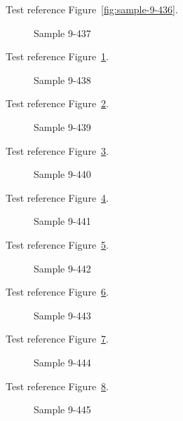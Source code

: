Test reference Figure~\ref{fig:sample-9-436}.

\begin{figure}[tbhp]
\caption{Sample 9-437}
\label{fig:sample-9-437}
\end{figure}

Test reference Figure~\ref{fig:sample-9-437}.

\begin{figure}[tbhp]
\caption{Sample 9-438}
\label{fig:sample-9-438}
\end{figure}

Test reference Figure~\ref{fig:sample-9-438}.

\begin{figure}[tbhp]
\caption{Sample 9-439}
\label{fig:sample-9-439}
\end{figure}

Test reference Figure~\ref{fig:sample-9-439}.

\begin{figure}[tbhp]
\caption{Sample 9-440}
\label{fig:sample-9-440}
\end{figure}

Test reference Figure~\ref{fig:sample-9-440}.

\begin{figure}[tbhp]
\caption{Sample 9-441}
\label{fig:sample-9-441}
\end{figure}

Test reference Figure~\ref{fig:sample-9-441}.

\begin{figure}[tbhp]
\caption{Sample 9-442}
\label{fig:sample-9-442}
\end{figure}

Test reference Figure~\ref{fig:sample-9-442}.

\begin{figure}[tbhp]
\caption{Sample 9-443}
\label{fig:sample-9-443}
\end{figure}

Test reference Figure~\ref{fig:sample-9-443}.

\begin{figure}[tbhp]
\caption{Sample 9-444}
\label{fig:sample-9-444}
\end{figure}

Test reference Figure~\ref{fig:sample-9-444}.

\begin{figure}[tbhp]
\caption{Sample 9-445}
\label{fig:sample-9-445}
\end{figure}

